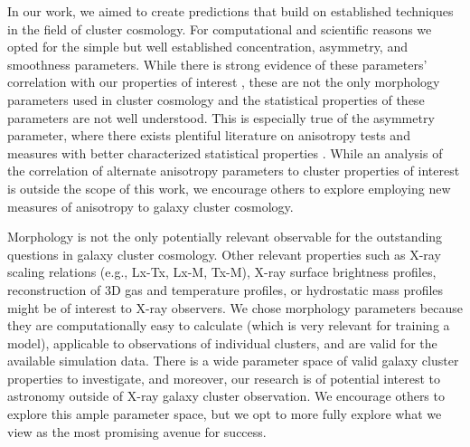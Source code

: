In our work, we aimed to create predictions that build on established techniques in the field of cluster cosmology. For computational and scientific reasons we opted for the simple but well established concentration, asymmetry, and smoothness parameters. While there is strong evidence of these parameters' correlation with our properties of interest \cite[e.g.,][]{Rasia_2013, Parekh_2015, Lovisari_2017, Green_2019}, these are not the only morphology parameters used in cluster cosmology and the statistical properties of these parameters are not well understood. This is especially true of the asymmetry parameter, where there exists plentiful literature on anisotropy tests and measures with better characterized statistical properties \cite[for examples and reviews of this topic see][]{mardia2000directional, feigelson2012modern, pewsey2013circular, baddeley2015spatial, RAJALA2018141}. While an analysis of the correlation of alternate anisotropy parameters to cluster properties of interest is outside the scope of this work, we encourage others to explore employing new measures of anisotropy to galaxy cluster cosmology.

Morphology is not the only potentially relevant observable for the outstanding questions in galaxy cluster cosmology. Other relevant properties such as X-ray scaling relations (e.g., Lx-Tx, Lx-M, Tx-M), X-ray surface brightness profiles, reconstruction of 3D gas and temperature profiles, or hydrostatic mass profiles might be of interest to X-ray observers. We chose morphology parameters because they are computationally easy to calculate (which is very relevant for training a model), applicable to observations of individual clusters, and are valid for the available simulation data. There is a wide parameter space of valid galaxy cluster properties to investigate, and moreover, our research is of potential interest to astronomy outside of X-ray galaxy cluster observation. We encourage others to explore this ample parameter space, but we opt to more fully explore what we view as the most promising avenue for success.

